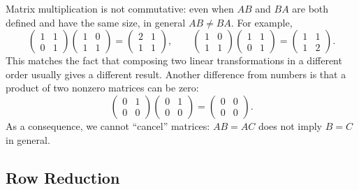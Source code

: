 \begin{remark}\label{L1-rem:noncommutative}
    Matrix multiplication is not commutative: even when $AB$ and $BA$ are both defined and have the same size, in general $AB \neq BA$. For example,
    \[\begin{pmatrix}
        1 & 1 \\
        0 & 1
    \end{pmatrix} \begin{pmatrix}
        1 & 0 \\
        1 & 1
    \end{pmatrix} = \begin{pmatrix}
        2 & 1 \\
        1 & 1
    \end{pmatrix}, \qquad \begin{pmatrix}
        1 & 0 \\
        1 & 1
    \end{pmatrix} \begin{pmatrix}
        1 & 1 \\
        0 & 1
    \end{pmatrix} = \begin{pmatrix}
        1 & 1 \\
        1 & 2
    \end{pmatrix}.\]
    This matches the fact that composing two linear transformations in a different order usually gives a different result. Another difference from numbers is that a product of two nonzero matrices can be zero:
    \[\begin{pmatrix}
        0 & 1 \\
        0 & 0
    \end{pmatrix} \begin{pmatrix}
        0 & 1 \\
        0 & 0
    \end{pmatrix} = \begin{pmatrix}
        0 & 0 \\
        0 & 0
    \end{pmatrix}.\]
    As a consequence, we cannot ``cancel'' matrices: $AB = AC$ does not imply $B = C$ in general.
\end{remark}

\subsection{Row Reduction}

